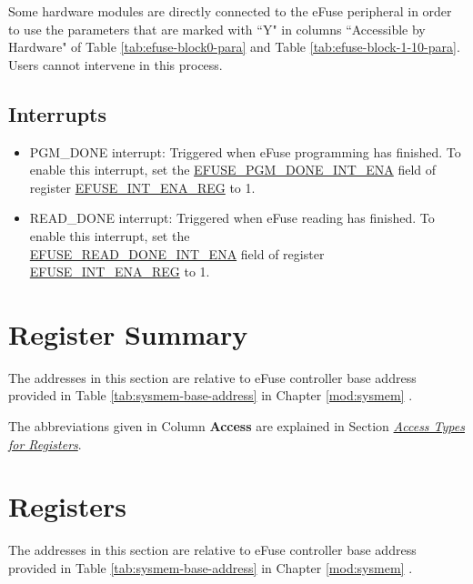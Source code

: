 \documentclass[main\_\_EN.tex]{subfiles}
\begin{document}
Some hardware modules are directly connected to the eFuse peripheral in order to use the parameters that are marked with ``Y" in columns ``Accessible by Hardware" of Table \ref{tab:efuse-block0-para} and Table \ref{tab:efuse-block-1-10-para}. Users cannot intervene in this process.

\subsection{Interrupts}
\begin{itemize}
\item PGM\_DONE interrupt: Triggered when eFuse programming has finished. To enable this interrupt, set the \hyperref[fielddesc:EFUSEPGMDONEINTENA]{EFUSE\_PGM\_DONE\_INT\_ENA} field of register \hyperref[regdesc:EFUSEINTENAREG]{EFUSE\_INT\_ENA\_REG} to 1.
\item READ\_DONE interrupt: Triggered when eFuse reading has finished. To enable this interrupt, set the \\\hyperref[fielddesc:EFUSEREADDONEINTENA]{EFUSE\_READ\_DONE\_INT\_ENA} field of register \hyperref[regdesc:EFUSEINTENAREG]{EFUSE\_INT\_ENA\_REG} to 1.
\end{itemize}





\clearpage
\section{Register Summary}
\label{sec:efuse-reg-summ}
\hypertarget{efuse-reg-summ}{}

The addresses in this section are relative to eFuse controller base address provided in Table \ref{tab:sysmem-base-address} in Chapter \ref{mod:sysmem} \textit{}.

The abbreviations given in Column \textbf{Access} are explained in Section \hyperref[glossary-access-types]{\textit{Access Types for Registers}}.






\clearpage
\section{Registers}

The addresses in this section are relative to eFuse controller base address provided in Table \ref{tab:sysmem-base-address} in Chapter \ref{mod:sysmem} \textit{}.


\end{document}
